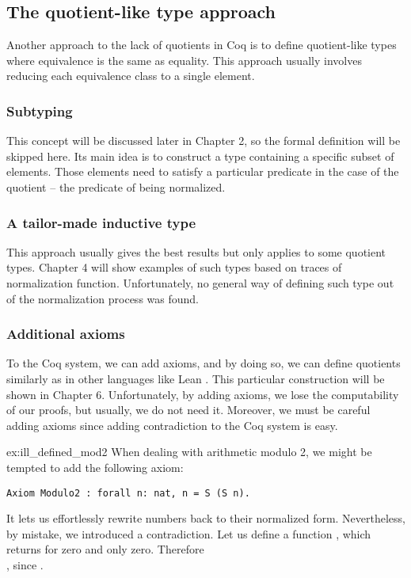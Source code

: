 \subsection{The quotient-like type approach}
Another approach to the lack of quotients in Coq is to define quotient-like types where equivalence is the same as equality. This approach usually involves reducing each equivalence class to a single element.

\subsubsection{Subtyping}
This concept will be discussed later in Chapter 2, so the formal definition will be skipped here. Its main idea is to construct a type containing a specific subset of elements. Those elements need to satisfy a particular predicate in the case of the quotient -- the predicate of being normalized.

\subsubsection{A tailor-made inductive type}
This approach usually gives the best results but only applies to some quotient types. Chapter 4 will show examples of such types based on traces of normalization function. Unfortunately, no general way of defining such type out of the normalization process was found.

\subsubsection{Additional axioms}
To the Coq system, we can add axioms, and by doing so, we can define quotients similarly as in other languages like Lean \cite{lean4}. This particular construction will be shown in Chapter 6. Unfortunately, by adding axioms, we lose the computability of our proofs, but usually, we do not need it. Moreover, we must be careful adding axioms since adding contradiction to the Coq system is easy.
\begin{example}{}{ex:ill_defined_mod2}
When dealing with arithmetic modulo 2, we might be tempted to add the following axiom:
\begin{verbatim}
Axiom Modulo2 : forall n: nat, n = S (S n).
\end{verbatim}
It lets us effortlessly rewrite numbers back to their normalized form. Nevertheless, by mistake, we introduced a contradiction. Let us define a function , which returns  for zero and only zero. Therefore  \\ , since .
\end{example}

